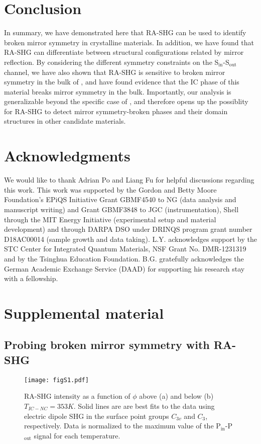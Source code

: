 \section{Conclusion}

In summary, we have demonstrated here that RA-SHG can be used to identify broken mirror symmetry in crystalline materials.
In addition, we have found that RA-SHG can differentiate between structural configurations related by mirror reflection.
By considering the different symmetry constraints on the S$_\mathrm{in}$-S$_\mathrm{out}$ channel, we have also shown that RA-SHG is sensitive to broken mirror symmetry in the bulk of \tastwo, and have found evidence that the IC phase of this material breaks mirror symmetry in the bulk.
Importantly, our analysis is generalizable beyond the specific case of \tastwo, and therefore opens up the possiblity for RA-SHG to detect mirror symmetry-broken phases and their domain structures in other candidate materials.

\section{Acknowledgments}

We would like to thank Adrian Po and Liang Fu for helpful discussions regarding this work.
This work was supported by the Gordon and Betty Moore Foundation’s EPiQS Initiative Grant GBMF4540 to NG (data analysis and manuscript writing) and Grant GBMF3848 to JGC (instrumentation), Shell through the MIT Energy Initiative (experimental setup and material development) and through DARPA DSO under DRINQS program grant number D18AC00014 (sample growth and data taking).
L.Y. acknowledges support by the STC Center for Integrated Quantum Materials, NSF Grant No. DMR-1231319 and by the Tsinghua Education Foundation.
B.G. gratefully acknowledges the German Academic Exchange Service (DAAD) for supporting his research stay with a fellowship.

\section{Supplemental material}

\subsection{Probing broken mirror symmetry with RA-SHG}
\begin{figure*}
\texttt{[image: figS1.pdf]}
\caption{\label{fig:figS1}RA-SHG intensity as a function of $\phi$ above (a) and below (b) $T_{IC-NC}=353K$.
Solid lines are are best fits to the data using electric dipole SHG in the surface point groups $C_{3v}$ and $C_3$, respectively.
Data is normalized to the maximum value of the P$_\mathrm{in}$-P$_\mathrm{out}$ signal for each temperature.}
\end{figure*}
